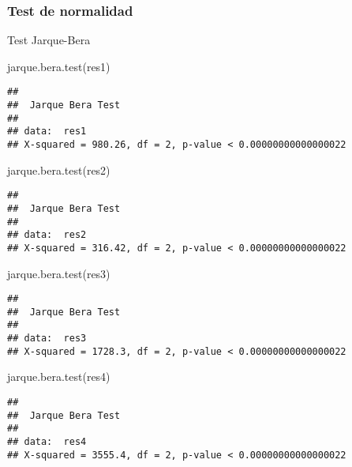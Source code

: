 \documentclass[
]{article}
\newenvironment{Shaded}{\begin{snugshade}}{\end{snugshade}}
\newcommand{\FunctionTok}[1]{\textcolor[rgb]{0.00,0.00,0.00}{#1}}
\newcommand{\NormalTok}[1]{#1}
\begin{document}
\hypertarget{test-de-normalidad}{%
\subsubsection{Test de normalidad}\label{test-de-normalidad}}

Test Jarque-Bera

\begin{Shaded}
\begin{Highlighting}[]
\FunctionTok{jarque.bera.test}\NormalTok{(res1)}
\end{Highlighting}
\end{Shaded}

\begin{verbatim}
## 
##  Jarque Bera Test
## 
## data:  res1
## X-squared = 980.26, df = 2, p-value < 0.00000000000000022
\end{verbatim}

\begin{Shaded}
\begin{Highlighting}[]
\FunctionTok{jarque.bera.test}\NormalTok{(res2)}
\end{Highlighting}
\end{Shaded}

\begin{verbatim}
## 
##  Jarque Bera Test
## 
## data:  res2
## X-squared = 316.42, df = 2, p-value < 0.00000000000000022
\end{verbatim}

\begin{Shaded}
\begin{Highlighting}[]
\FunctionTok{jarque.bera.test}\NormalTok{(res3)}
\end{Highlighting}
\end{Shaded}

\begin{verbatim}
## 
##  Jarque Bera Test
## 
## data:  res3
## X-squared = 1728.3, df = 2, p-value < 0.00000000000000022
\end{verbatim}

\begin{Shaded}
\begin{Highlighting}[]
\FunctionTok{jarque.bera.test}\NormalTok{(res4)}
\end{Highlighting}
\end{Shaded}

\begin{verbatim}
## 
##  Jarque Bera Test
## 
## data:  res4
## X-squared = 3555.4, df = 2, p-value < 0.00000000000000022
\end{verbatim}
\end{document}
